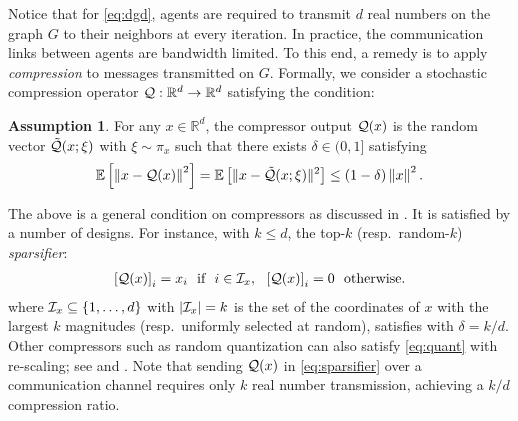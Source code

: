 \documentclass[10pt]{article} %
\newcommand{\revision}{}
\theoremstyle{plain}
\theoremstyle{definition}
\newtheorem{assumption}[theorem]{Assumption}
\theoremstyle{remark}
\newcommand{\norm}[1]{\left\| #1 \right\|}
\begin{document}
Notice that for \eqref{eq:dgd}, agents are required to transmit $d$ real numbers on the graph $G$ to their neighbors at every iteration. In practice, the communication links between agents are bandwidth limited. To this end, a remedy is to apply \emph{compression} to messages transmitted on $G$. 
Formally, we consider a stochastic compression operator ${\cal Q}: \mathbb{R}^d \to \mathbb{R}^d$ satisfying the condition:
\begin{assumption}\label{ass:compress}
    For any $x \in \mathbb{R}^d$, the compressor output ${\cal Q}(x)$ is the random vector $\tilde{\cal Q}(x; \xi)$ with $\xi \sim \pi_x$ such that there exists $\delta \in (0,1]$ satisfying\vspace{-.05cm}
    \begin{equation} \label{eq:quant}
        \mathbb{E} \left[ \norm{ x - {\cal Q}(x) }^2 \right] = \mathbb{E} \left[ \| x - \tilde{\cal Q}(x; \xi) \|^2 \right] \leq (1-\delta) \norm{x}^2.
    \end{equation}
\end{assumption}
\vspace{-.3cm}
The above is a general condition on compressors as discussed in \citep{koloskova2019decentralized}. It is satisfied by a number of designs. For instance, with $k \leq d$, the top-$k$ (resp.~random-$k$) \emph{sparsifier}:
\begin{align} \label{eq:sparsifier}
\left[ {\cal Q}(x) \right]_i = x_i~~\text{if}~~i \in {\cal I}_x,~~\left[ {\cal Q}(x) \right]_i = 0~~\text{otherwise}.
\end{align} 
where ${\cal I}_x \subseteq \{1,\ldots,d\}$ with $|{\cal I}_x| = k$ is the set of the coordinates of $x$ with the largest $k$ magnitudes (resp.~uniformly selected at random), satisfies  with $\delta = k/d$. Other compressors such as random quantization \citep{wen2017terngrad,alistarh2017qsgd, stich2018sparsified, alistarh2019convergence} can also satisfy \eqref{eq:quant} {\revision with re-scaling}; see {\revision {} and \citep{koloskova2019decentralized}}. 
Note that sending ${\cal Q}(x)$ in \eqref{eq:sparsifier} over a communication channel requires only $k$ real number transmission, achieving a $k/d$ compression ratio. 
\end{document}
